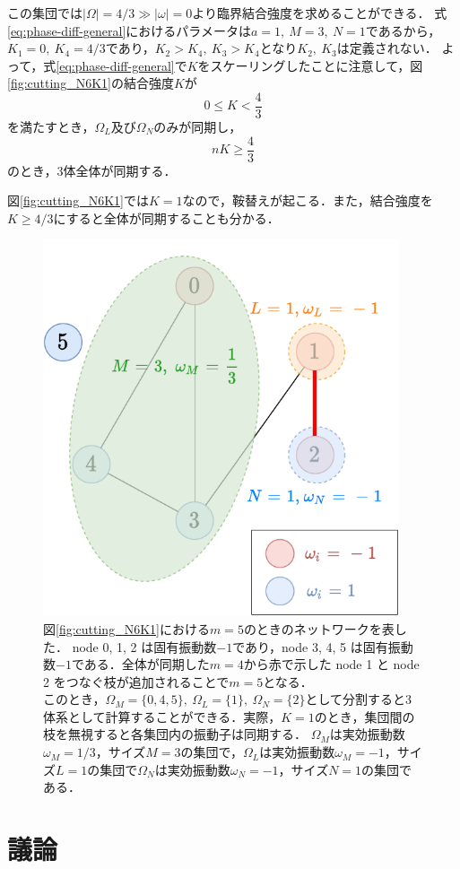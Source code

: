 \documentclass[../main]{subfiles}
\begin{document}
この集団では$|\Omega|=4/3\gg|\omega|=0$より臨界結合強度を求めることができる．
式\eqref{eq:phase-diff-general}におけるパラメータは$a=1,\ M=3,\ N=1$であるから，
$K_1=0,\ K_4=4/3$であり，$K_2>K_4,\ K_3>K_4$となり$K_2,\ K_3$は定義されない．
よって，式\eqref{eq:phase-diff-general}で$K$をスケーリングしたことに注意して，図\ref{fig:cutting_N6K1}の結合強度$K$が
\[0\leq K<\frac{4}{3}\]
を満たすとき，$\Omega_L$及び$\Omega_N$のみが同期し，
\[nK\geq \frac{4}{3}\]
のとき，3体全体が同期する．

図\ref{fig:cutting_N6K1}では$K=1$なので，鞍替えが起こる．また，結合強度を$K\geq 4/3$にすると全体が同期することも分かる．
\begin{figure}[tbp]
\centering
\includegraphics[width=105mm]{images/cutting_N6_drawio.pdf}
\centering
\caption{図\ref{fig:cutting_N6K1}における$m=5$のときのネットワークを表した．
node 0, 1, 2 は固有振動数$-1$であり，node 3, 4, 5 は固有振動数$-1$である．全体が同期した$m=4$から赤で示した node 1 と node 2 をつなぐ枝が追加されることで$m=5$となる．\\
このとき，$\Omega_M=\{0,4,5\},\ \Omega_L=\{1\},\ \Omega_N=\{2\}$として分割すると3体系として計算することができる．実際，$K=1$のとき，集団間の枝を無視すると各集団内の振動子は同期する．
$\Omega_M$は実効振動数$\omega_M=1/3$，サイズ$M=3$の集団で，$\Omega_L$は実効振動数$\omega_M=-1$，サイズ$L=1$の集団で$\Omega_N$は実効振動数$\omega_N=-1$，サイズ$N=1$の集団である．}
\label{fig:cutting_N6-m5}
\end{figure}

\section{議論}
\label{sec:3body-discussion}
\end{document}
